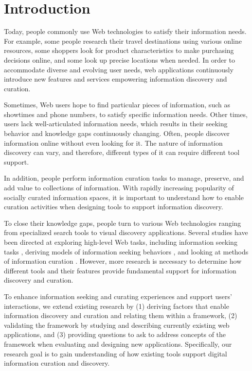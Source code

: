 \documentclass{casconpaper}
\begin{document}
{\section{Introduction}
Today, people commonly use Web technologies to satisfy their information needs. For example, some people research their travel destinations using various online resources, some shoppers look for product characteristics to make purchasing decisions online, and some look up precise locations when needed. In order to accommodate diverse and evolving user needs, web applications continuously introduce new features and services empowering information discovery and curation. 

Sometimes, Web users hope to find particular pieces of information, such as showtimes and phone numbers, to satisfy specific information needs. Other times, users lack well-articulated information needs, which results in their seeking behavior and knowledge gaps continuously changing. Often, people discover information online without even looking for it. The nature of information discovery can vary, and therefore, different types of it can require different tool support.  

In addition, people perform information curation tasks to manage, preserve, and add value to collections of information. With rapidly increasing popularity of socially curated information spaces, it is important to understand how to enable curation activities when designing tools to support information discovery.

To close their knowledge gaps, people turn to various Web technologies ranging from specialized search tools to visual discovery applications. Several studies have been directed at exploring high-level Web tasks, including information seeking tasks \cite{morrison, kellar2006, kellar2007, sellen}, deriving models of information seeking behaviors \cite{choo}, and looking at methods of information curation \cite{wittaker}. However, more research is necessary to determine how different tools and their features provide fundamental support for information discovery and curation.

To enhance information seeking and curating experiences and support users' interactions, we extend existing research by (1) deriving factors that enable information discovery and curation and relating them within a framework, (2) validating the framework by studying and describing currently existing web applications, and (3) providing questions to ask to address concepts of the framework when evaluating and designing new applications. Specifically, our research goal is to gain understanding of how existing tools support digital information curation and discovery. 

}
\end{document}
